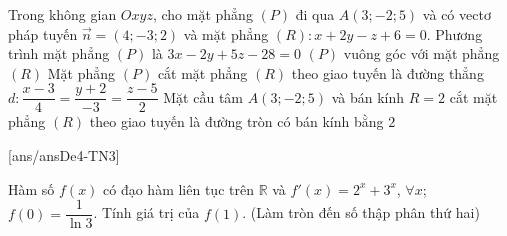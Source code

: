 \begin{ex}%
	Trong không gian $Oxyz$, cho mặt phẳng $(P)$ đi qua $A(3;-2;5)$ và có vectơ pháp tuyến $\vec{n}=(4;-3;2)$ và mặt phẳng $(R)\colon x+2y-z+6=0$.
	\choiceTF
	{Phương trình mặt phẳng $(P)$ là $3x-2y+5z-28=0$}
	{\True $(P)$ vuông góc với mặt phẳng $(R)$}
	{Mặt phẳng $(P)$ cắt mặt phẳng $(R)$ theo giao tuyến là đường thẳng $d\colon \dfrac{x-3}{4}=\dfrac{y+2}{-3}=\dfrac{z-5}{2}$}
	{\True Mặt cầu tâm $A(3;-2;5)$ và bán kính $R=2$ cắt mặt phẳng $(R)$ theo giao tuyến là đường tròn có bán kính bằng $2$}
	\end{ex}

\TNSA
{}[ans/ansDe4-TN3]
\begin{ex}%
Hàm số $f(x)$ có đạo hàm liên tục trên $\mathbb{R}$ và $f'(x)=2^x+3^x$, $\forall x$; $f(0)=\dfrac{1}{\ln3}$. Tính giá trị của $f(1)$. (Làm tròn đến số thập phân thứ hai)
\end{ex}

